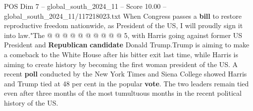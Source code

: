 \begin{textsample}{POS Dim 7 – global\_south\_2024\_11 – Score 10.00 – global\_south\_2024\_11/117218023.txt}
When Congress passes a \textbf{bill} to restore reproductive freedom nationwide, as President of the US, I will proudly sign it into law."The @ @ @ @ @ @ @ @ @ @ 5, with Harris going against former US President and \textbf{Republican} \textbf{candidate} Donald Trump.Trump is aiming to make a comeback to the White House after his bitter exit last time, while Harris is aiming to create history by becoming the first woman president of the US.
A recent \textbf{poll} conducted by the New York Times and Siena College showed Harris and Trump tied at 48 per cent in the popular \textbf{vote}.
The two leaders remain tied even after three months of the most tumultuous months in the recent political history of the US.

\end{textsample}
